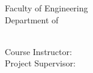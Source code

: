\begin{titlepage}
{\begin{center}
			Faculty of Engineering \\
			\ifdefined \@department Department of \@department \\ \fi
			\vspace{3em}
		
			\@date \\
			
			\ifdefined \@instructor Course Instructor: \@instructor \\ \fi
			\ifdefined \@supervisor Project Supervisor: \@supervisor \\ \fi
			
		\end{center}
	}{\relax} %
	
	\makeatother %
\end{titlepage}

